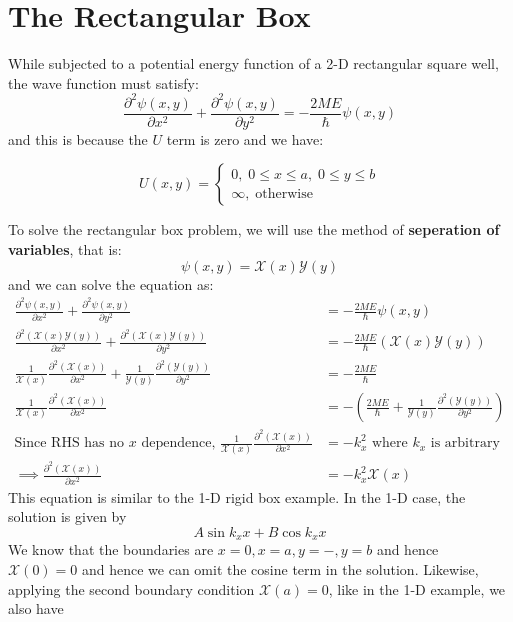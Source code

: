 \documentclass[11pt,fleqn]{book}
\begin{document}
\section{The Rectangular Box}
While subjected to a potential energy function of a 2-D rectangular square well, the wave function must satisfy:
$$\frac{\partial^2\psi(x,y)}{\partial x^2}+\frac{\partial^2\psi(x,y)}{\partial y^2}=-\frac{2ME}{\hslash}\psi(x,y)$$
and this is because the $U$ term is zero and we have:
\begin{proposition}
    \[
    U(x,y)=\begin{cases}
        0,\;0\leq x\leq a,\;0\leq y\leq b\\
        \infty,\;\text{otherwise}
    \end{cases}
    \]
\end{proposition}
To solve the rectangular box problem, we will use the method of \textbf{seperation of variables}, that is:
$$\psi(x,y)=\mathscr{X}(x)\mathscr{Y}(y)$$
and we can solve the equation as:
\begin{align*}
    \frac{\partial^2\psi(x,y)}{\partial x^2}+\frac{\partial^2\psi(x,y)}{\partial y^2}&=-\frac{2ME}{\hslash}\psi(x,y)\\
    \frac{\partial^2\left(\mathscr{X}(x)\mathscr{Y}(y)\right)}{\partial x^2}+\frac{\partial^2\left(\mathscr{X}(x)\mathscr{Y}(y)\right)}{\partial y^2}&=-\frac{2ME}{\hslash}\left(\mathscr{X}(x)\mathscr{Y}(y)\right)\\
    \frac{1}{\mathscr{X}(x)}\frac{\partial^2\left(\mathscr{X}(x)\right)}{\partial x^2}+\frac{1}{\mathscr{Y}(y)}\frac{\partial^2\left(\mathscr{Y}(y)\right)}{\partial y^2}&=-\frac{2ME}{\hslash}\\
    \frac{1}{\mathscr{X}(x)}\frac{\partial^2\left(\mathscr{X}(x)\right)}{\partial x^2}&=-\left(\frac{2ME}{\hslash}+\frac{1}{\mathscr{Y}(y)}\frac{\partial^2\left(\mathscr{Y}(y)\right)}{\partial y^2}\right)\\
    \text{Since RHS has no $x$ dependence, }\frac{1}{\mathscr{X}(x)}\frac{\partial^2\left(\mathscr{X}(x)\right)}{\partial x^2}&=-k_x^2\text{ where $k_x$ is arbitrary}\\
    \implies\frac{\partial^2\left(\mathscr{X}(x)\right)}{\partial x^2}&=-k_x^2\mathscr{X}(x)
\end{align*}
This equation is similar to the 1-D rigid box example. In the 1-D case, the solution is given by 
$$A\sin k_xx+B\cos k_xx$$ 
We know that the boundaries are $x=0,x=a,y=-,y=b$ and hence $\mathscr{X}(0)=0$ and hence we can omit the cosine term in the solution. Likewise, applying the second boundary condition $\mathscr{X}(a)=0$, like in the 1-D example, we also have 
\end{document}
